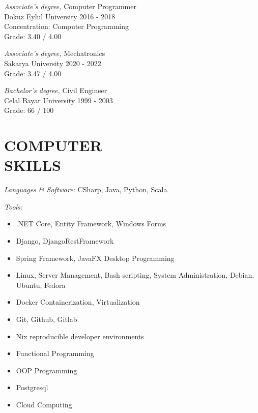 \documentclass[line,margin]{res}
\begin{document}
\begin{resume}
                {\sl Associate's degree,} Computer Programmer \\
                Dokuz Eylul University 
                2016 - 2018 \\
                Concentration: Computer Programming \\
                Grade: 3.40 / 4.00 
 
                {\sl Associate's degree,} Mechatronics \\
                Sakarya University 
                2020 - 2022 \\
                Grade: 3.47 / 4.00 

                {\sl Bachelor's degree,} Civil Engineer \\
                Celal Bayar University 
                1999 - 2003 \\
                Grade: 66 / 100 
 
\section{COMPUTER \\ SKILLS} {\sl Languages \& Software:} CSharp, Java, Python, 
                Scala
                
                {\sl Tools:} 
                 \begin{itemize}  \itemsep -2pt %
                   \item .NET Core, Entity Framework, Windows Forms
                   \item Django, DjangoRestFramework
                   \item Spring Framework, JavaFX Desktop Programming
                   \item Linux, Server Management, Bash scripting, System Administration, Debian, Ubuntu, Fedora
                   \item Docker Containerization, Virtualization
                   \item Git, Github, Gitlab
                   \item Nix reproducible developer environments
                   \item Functional Programming 
                   \item OOP Programming 
                   \item Postgresql 
                   \item Cloud Computing 
 

\end{itemize}
\end{resume}
\end{document}
